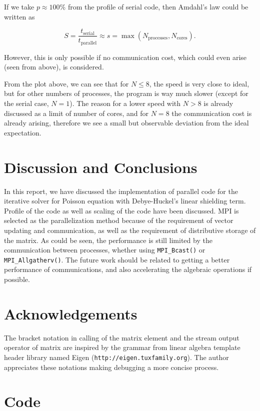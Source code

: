 \documentclass{article}
\begin{document}
\begin{spacing}{1.1}
If we take $p \approx 100\%$ from the profile of serial code, then Amdahl's law could be written as

\[S=\frac{t_\mathrm{serial}}{t_\mathrm{parallel}} \approx s = \max{(N_\mathrm{processes}, N_\mathrm{cores})}.\]

However, this is only possible if no communication cost, which could even arise (seen from above), is considered. 

From the plot above, we can see that for $N \leq 8$, the speed is very close to ideal, but for other numbers of processes, the program is way much slower (except for the serial case, $N=1$). The reason for a lower speed with $N > 8$ is already discussed as a limit of number of cores, and for $N = 8$ the communication cost is already arising, therefore we see a small but observable deviation from the ideal expectation.

\section{Discussion and Conclusions}

In this report, we have discussed the implementation of parallel code for the iterative solver for Poisson equation with Debye-Huckel's linear shielding term. Profile of the code as well as scaling of the code have been discussed. MPI is selected as the parallelization method because of the requirement of vector updating and communication, as well as the requirement of distributive storage of the matrix. As could be seen, the performance is still limited by the communication between processes, whether using \texttt{MPI\_Bcast()} or \texttt{MPI\_Allgatherv()}. The future work should be related to getting a better performance of communications, and also accelerating the algebraic operations if possible.

\newpage
\begin{appendices}

\section{Acknowledgements}

The bracket notation in calling of the matrix element and the stream output operator of matrix are inspired by the grammar from linear algebra template header library named Eigen (\texttt{http://eigen.tuxfamily.org}). The author appreciates these notations making debugging a more concise process.

\section{Code}


\end{appendices}
\end{spacing}
\end{document}
